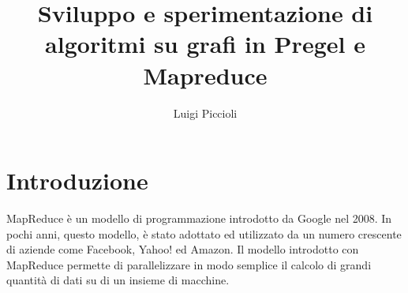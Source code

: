 \documentclass[LaM,binding=0.6cm]{sapthesis}
\title{Sviluppo e sperimentazione di algoritmi su grafi in Pregel e Mapreduce}
\author{Luigi Piccioli}
\begin{document}
\frontmatter

\maketitle


%

\tableofcontents

%
%
%
%
%
%




\mainmatter

\chapter{Introduzione}



MapReduce \cite{Dean:2008:MSD:1327452.1327492} è un modello di programmazione introdotto da Google nel 2008. In pochi anni, questo modello, è stato adottato ed utilizzato da un numero crescente di aziende come Facebook, Yahoo! ed Amazon. Il modello introdotto con MapReduce permette di parallelizzare in modo semplice il calcolo di grandi quantità di dati su di un insieme di macchine.
\end{document}
